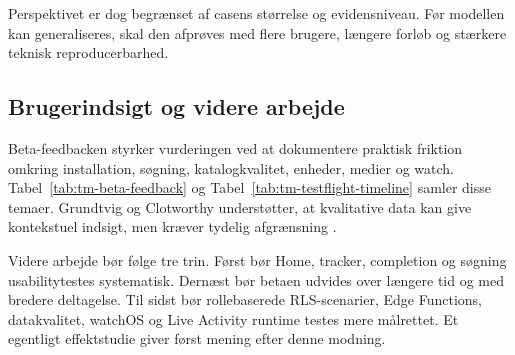 Perspektivet er dog begrænset af casens størrelse og evidensniveau. Før modellen kan generaliseres, skal den afprøves med flere brugere, længere forløb og stærkere teknisk reproducerbarhed.

\subsection{Brugerindsigt og videre arbejde}

Beta-feedbacken styrker vurderingen ved at dokumentere praktisk friktion omkring installation, søgning, katalogkvalitet, enheder, medier og watch. Tabel~\ref{tab:tm-beta-feedback} og Tabel~\ref{tab:tm-testflight-timeline} samler disse temaer. Grundtvig og Clotworthy understøtter, at kvalitative data kan give kontekstuel indsigt, men kræver tydelig afgrænsning \cite{grundtvig2025_analyse_data,clotworthy2025_etik_kvalitet_forskning}.

Videre arbejde bør følge tre trin. Først bør Home, tracker, completion og søgning usabilitytestes systematisk. Dernæst bør betaen udvides over længere tid og med bredere deltagelse. Til sidst bør rollebaserede RLS-scenarier, Edge Functions, datakvalitet, watchOS og Live Activity runtime testes mere målrettet. Et egentligt effektstudie giver først mening efter denne modning.

